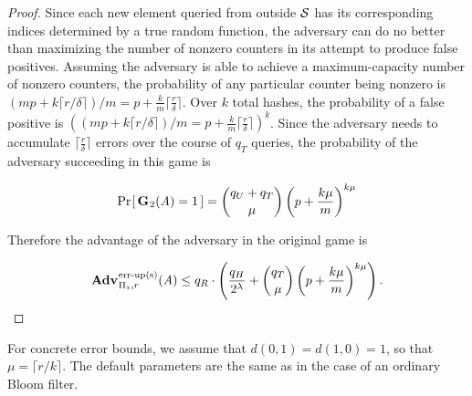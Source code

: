 \begin{proof}
Since each new element queried from outside $\mathcal{S}$ has its corresponding indices
determined by a true random function, the adversary can do no better than
maximizing the number of nonzero counters in its attempt to produce false
positives. Assuming the adversary is able to achieve a maximum-capacity number
of nonzero counters, the probability of any particular counter being nonzero is
$(mp + k\lceil r/\delta \rceil)/m = p +
\frac{k}{m}\lceil\frac{r}{\delta}\rceil$. Over $k$ total hashes, the probability
of a false positive is $\left((mp + k\lceil r/\delta \rceil)/m = p +
\frac{k}{m}\lceil\frac{r}{\delta}\rceil\right)^k$. Since the adversary needs to
accumulate $\lceil\frac{r}{\delta}\rceil$ errors over the course of $q_T$
queries, the probability of the adversary succeeding in this game is

$$\Pr\hspace{-1pt}\left[\,\mathbf{G}\hspace{0.5pt}_2(\mathit{A}) = 1\,\right] = \binom{q_U + q_T}{\mu}\left(p+\frac{k\mu}{m}\right)^{k\mu}$$

Therefore the advantage of the adversary in the original game is

$$\Adv{\erreps}_{\struct_s,r}(\advA) \le q_R \cdot \left(\frac{q_H}{2^\lambda} + \binom{q_T}{\mu}\left(p+\frac{k\mu}{m}\right)^{k\mu}\right).$$


\end{proof}

For concrete error bounds, we assume that $d(0,1) = d(1,0) = 1$, so that $\mu =
\lceil r/k \rceil$. The default parameters are the same as in the case of an
ordinary Bloom filter.




